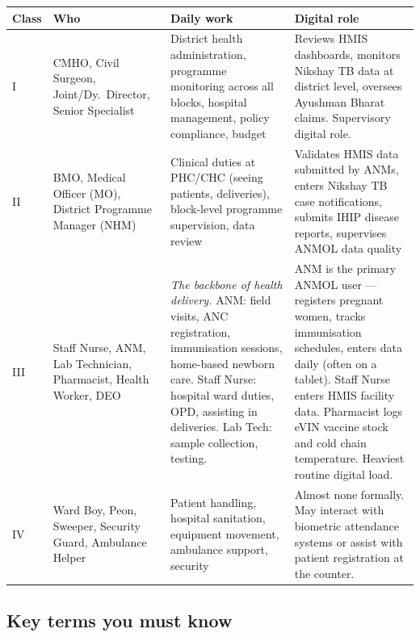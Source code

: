 \documentclass[11pt,a4paper]{article}
\begin{document}
\begin{tabularx}{\textwidth}{@{}L{1cm} L{3cm} L{4.8cm} X@{}}
\toprule
\textbf{Class} & \textbf{Who} & \textbf{Daily work} & \textbf{Digital role} \\
\midrule
I & CMHO, Civil Surgeon, Joint/Dy.\ Director, Senior Specialist & District health administration, programme monitoring across all blocks, hospital management, policy compliance, budget & Reviews HMIS dashboards, monitors Nikshay TB data at district level, oversees Ayushman Bharat claims. Supervisory digital role. \\[6pt]
II & BMO, Medical Officer (MO), District Programme Manager (NHM) & Clinical duties at PHC/CHC (seeing patients, deliveries), block-level programme supervision, data review & Validates HMIS data submitted by ANMs, enters Nikshay TB case notifications, submits IHIP disease reports, supervises ANMOL data quality \\[6pt]
III & Staff Nurse, ANM, Lab Technician, Pharmacist, Health Worker, DEO & \textit{The backbone of health delivery.} ANM: field visits, ANC registration, immunisation sessions, home-based newborn care. Staff Nurse: hospital ward duties, OPD, assisting in deliveries. Lab Tech: sample collection, testing. & ANM is the primary ANMOL user --- registers pregnant women, tracks immunisation schedules, enters data daily (often on a tablet). Staff Nurse enters HMIS facility data. Pharmacist logs eVIN vaccine stock and cold chain temperature. Heaviest routine digital load. \\[6pt]
IV & Ward Boy, Peon, Sweeper, Security Guard, Ambulance Helper & Patient handling, hospital sanitation, equipment movement, ambulance support, security & Almost none formally. May interact with biometric attendance systems or assist with patient registration at the counter. \\
\bottomrule
\end{tabularx}

\subsection{Key terms you must know}
\end{document}
